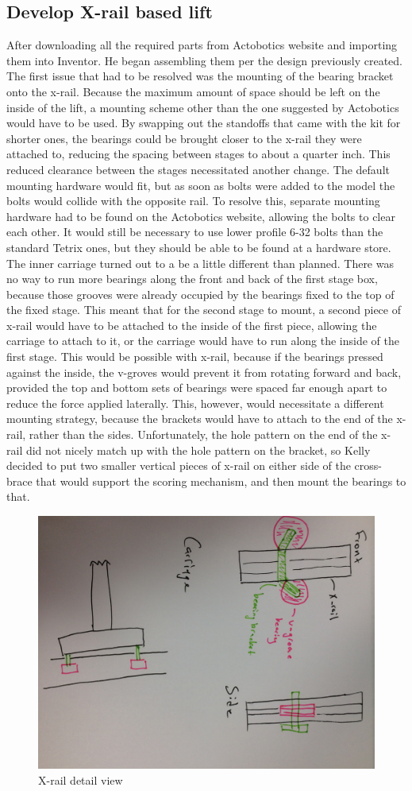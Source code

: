 \documentclass{article}
\begin{document}
\subsection{Develop X-rail based lift}
 After downloading all the required parts from Actobotics website and importing them into Inventor. He began assembling them per the design previously created. The first issue that had to be resolved was the mounting of the bearing bracket onto the x-rail. Because the maximum amount of space should be left on the inside of the lift, a mounting scheme other than the one suggested by Actobotics would have to be used. By swapping out the standoffs that came with the kit for shorter ones, the bearings could be brought closer to the x-rail they were attached to, reducing the spacing between stages to about a quarter inch. This reduced clearance between the stages necessitated another change. The default mounting hardware would fit, but as soon as bolts were added to the model the bolts would collide with the opposite rail. To resolve this, separate mounting hardware had to be found on the Actobotics website, allowing the bolts to clear each other. It would still be necessary to use lower profile 6-32 bolts than the standard Tetrix ones, but they should be able to be found at a hardware store. The inner carriage turned out to a be a little different than planned. There was no way to run more bearings along the front and back of the first stage box, because those grooves were already occupied by the bearings fixed to the top of the fixed stage. This meant that for the second stage to mount, a second piece of x-rail would have to be attached to the inside of the first piece, allowing the carriage to attach to it, or the carriage would have to run along the inside of the first stage. This would be possible with x-rail, because if the bearings pressed against the inside, the v-groves would prevent it from rotating forward and back, provided the top and bottom sets of bearings were spaced far enough apart to reduce the force applied laterally. This, however, would necessitate a different mounting strategy, because the brackets would have to attach to the end of the x-rail, rather than the sides. Unfortunately, the hole pattern on the end of the x-rail did not nicely match up with the hole pattern on the bracket, so Kelly decided to put two smaller vertical pieces of x-rail on either side of the cross-brace that would support the scoring mechanism, and then mount the bearings to that. 
 
 \begin{figure}
     \centering
     \includegraphics[width=.6\textwidth]{05_10-01/images/xrail.jpg}
     \caption{X-rail detail view}
     \label{fig:my_label}
 \end{figure}
\end{document}
